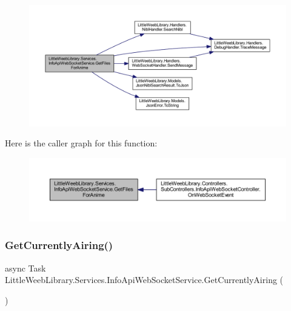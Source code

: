 \begin{figure}[H]
\begin{center}
\leavevmode
\includegraphics[width=350pt]{class_little_weeb_library_1_1_services_1_1_info_api_web_socket_service_a299be5b400f1368ab169599395a3e56d_cgraph}
\end{center}
\end{figure}
Here is the caller graph for this function\+:\nopagebreak
\begin{figure}[H]
\begin{center}
\leavevmode
\includegraphics[width=350pt]{class_little_weeb_library_1_1_services_1_1_info_api_web_socket_service_a299be5b400f1368ab169599395a3e56d_icgraph}
\end{center}
\end{figure}
\mbox{\label{class_little_weeb_library_1_1_services_1_1_info_api_web_socket_service_aec42147d67551cb17c458453ef40f3bc}} 
\subsubsection{\texorpdfstring{Get\+Currently\+Airing()}{GetCurrentlyAiring()}\hspace{0.1cm}{\footnotesize\ttfamily [1/2]}}
{\footnotesize\ttfamily async Task Little\+Weeb\+Library.\+Services.\+Info\+Api\+Web\+Socket\+Service.\+Get\+Currently\+Airing (\begin{DoxyParamCaption}{ }\end{DoxyParamCaption})}



